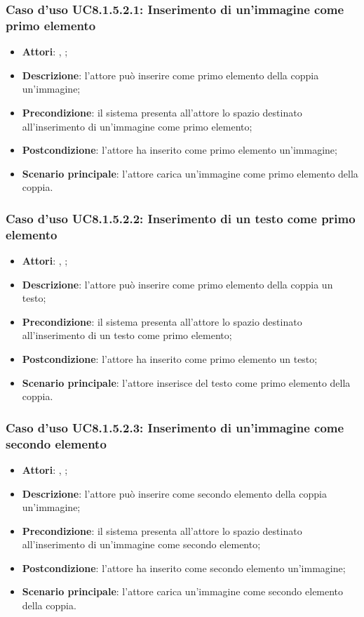		\subsubsection{Caso d'uso UC8.1.5.2.1: Inserimento di un'immagine come primo elemento}
		\begin{itemize}
			\item \textbf{Attori}: \uau, \uaupro;
			\item \textbf{Descrizione}: l'attore può inserire come primo elemento della coppia un'immagine;
			\item \textbf{Precondizione}: il sistema presenta all'attore lo spazio destinato all'inserimento di un'immagine come primo elemento;
			\item \textbf{Postcondizione}: l'attore ha inserito come primo elemento un'immagine;
			\item \textbf{Scenario principale}: l'attore carica un'immagine come primo elemento della coppia.
		\end{itemize}
		
		\subsubsection{Caso d'uso UC8.1.5.2.2: Inserimento di un testo come primo elemento}
		\begin{itemize}
			\item \textbf{Attori}: \uau, \uaupro;
			\item \textbf{Descrizione}: l'attore può inserire come primo elemento della coppia un testo;
			\item \textbf{Precondizione}: il sistema presenta all'attore lo spazio destinato all'inserimento di un testo come primo elemento;
			\item \textbf{Postcondizione}: l'attore ha inserito come primo elemento un testo;
			\item \textbf{Scenario principale}: l'attore inserisce del testo come primo elemento della coppia.
		\end{itemize}
		
			\subsubsection{Caso d'uso UC8.1.5.2.3: Inserimento di un'immagine come secondo elemento}
		\begin{itemize}
			\item \textbf{Attori}: \uau, \uaupro;
			\item \textbf{Descrizione}: l'attore può inserire come secondo elemento della coppia un'immagine;
			\item \textbf{Precondizione}: il sistema presenta all'attore lo spazio destinato all'inserimento di un'immagine come secondo elemento;
			\item \textbf{Postcondizione}: l'attore ha inserito come secondo elemento un'immagine;
			\item \textbf{Scenario principale}: l'attore carica un'immagine come secondo elemento della coppia.
		\end{itemize}
		

